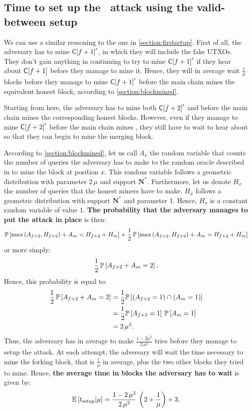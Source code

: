 \subsection{Time to set up the \cs\ attack using the valid-between setup}

We can use a similar reasoning to the one in \autoref{section:firstsetup}. First of all, the adversary has to mine \(\Cindex{f+1}'\), in which they will include the fake UTXOs. They don't gain anything in continuing to try to mine \(\Cindex{f+1}'\) if they hear about \(\Cindex{f+1}\) before they manage to mine it. Hence, they will in average wait \(\frac{1}{\mu}\) blocks before they manage to mine \(\Cindex{f+1}'\) before the main chain mines the equivalent honest block, according to \autoref{section:blockmined}.

Starting from here, the adversary has to mine both \(\Cindex{f+2}'\) and  before the main chain mines the corresponding honest blocks. However, even if they manage to mine \(\Cindex{f+2}'\) before the main chain mines , they still have to wait to hear about  so that they can begin to mine the merging block.

According to \autoref{section:blockmined}, let us call \(A_x\) the random variable that counts the number of queries the adversary has to make to the random oracle described in \cite{Backbone} to mine the block at position \(x\). This random variable follows a geometric distribution with parameter \(2\,\mu\) and support \(\mathbf{N}^*\). Furthermore, let us denote \(H_x\) the number of queries that the honest miners have to make. \(H_x\) follows a geometric distribution with support \(\mathbf{N}^*\) and parameter 1. Hence, \(H_x\) is a constant random variable of value \(1\). \textbf{The probability that the adversary manages to put the attack in place} is then:
\[\P{\max\left(A_{f+2},H_{f+2}\right)+A_{m} < H_{f+2}+H_{m}} + \frac12\,\P{\max\left(A_{f+2},H_{f+2}\right)+A_{m} = H_{f+2}+H_{m}}\]
or more simply:
\[\frac12\,\P{A_{f+2}+A_{m} = 2}.\]
Hence, this probability is equal to:
\begin{align*}
    \frac12\,\P{A_{f+2}+A_{m} = 2} &= \frac12\P{\left(A_{f+2}=1\right)\cap\left(A_{m}=1\right)}\\
    &= \frac12\P{A_{f+2}=1}\,\P{A_{m}=1}\\
    &= 2\,\mu^2.
\end{align*}
Thus, the adversary has in average to make \(\frac{1-2\mu^2}{2\,\mu^2}\) tries before they manage to setup the attack. At each attempt, the adversary will wait the time necessary to mine the forking block, that is \(\frac{1}{\mu}\) in average, plus the two other blocks they tried to mine. Hence, \textbf{the average time in blocks the adversary has to wait} is given by:
\[\ES{t_{\text{setup}}}{\mu} = \frac{1-2\,\mu^2}{2\,\mu^2}\,\left(2+\frac{1}{\mu}\right)+3.\]

